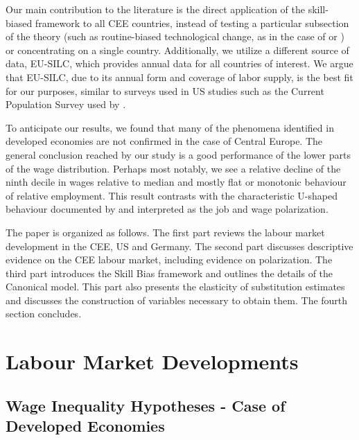 \documentclass[11pt]{article}
\begin{document}
Our main contribution to the literature is the direct application of the skill-biased framework to all CEE countries, instead of testing a particular subsection of the theory (such as routine-biased technological change, as in the case of \citet{arendt2019technical} or \citet{hardy2018educational}) or concentrating on a single country. Additionally, we utilize a different source of data, EU-SILC, which provides annual data for all countries of interest. We argue that EU-SILC, due to its annual form and coverage of labor supply, is the best fit for our purposes, similar to surveys used in US studies such as the Current Population Survey used by \citet{katz1992changes}.

To anticipate our results, we found that many of the phenomena identified in developed economies are not confirmed in the case of Central Europe. The general conclusion reached by our study is a good performance of the lower parts of the wage distribution. Perhaps most notably, we see a relative decline of the ninth decile in wages relative to median and mostly flat or monotonic behaviour of relative employment. This result contrasts with the characteristic U-shaped behaviour documented by \citet{acemoglu2012does} and interpreted as the job and wage polarization. %

The paper is organized as follows. The first part reviews the labour market development in the CEE, US and Germany. The second part discusses descriptive evidence on the CEE labour market, including evidence on polarization. The third part introduces the Skill Bias framework and outlines the details of the Canonical model. This part also presents the elasticity of substitution estimates and discusses the construction of variables necessary to obtain them. The fourth section concludes.

\section{Labour Market Developments}
\subsection{Wage Inequality Hypotheses - Case of Developed Economies}
\end{document}
